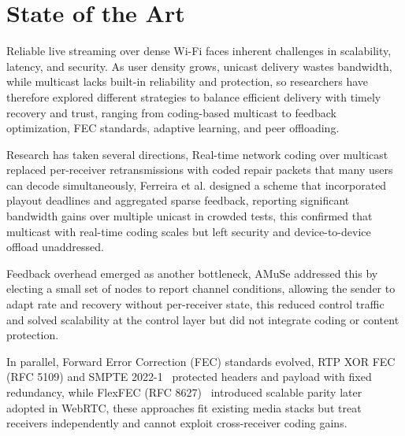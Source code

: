 
\chapter{State of the Art}


\label{State of the Art}

\quad Reliable live streaming over dense Wi-Fi faces inherent challenges in scalability, latency, and security. As user density grows, unicast delivery wastes bandwidth, while multicast lacks built-in reliability and protection, so researchers have therefore explored different strategies to balance efficient delivery with timely recovery and trust, ranging from coding-based multicast to feedback optimization, FEC standards, adaptive learning, and peer offloading.

\quad Research has taken several directions, Real-time network coding over multicast replaced per-receiver retransmissions with coded repair packets that many users can decode simultaneously, Ferreira et al.\cite{ferreira2019realtime} designed a scheme that incorporated playout deadlines and aggregated sparse feedback, reporting significant bandwidth gains over multiple unicast in crowded tests, this confirmed that multicast with real-time coding scales but left security and device-to-device offload unaddressed.

\quad Feedback overhead emerged as another bottleneck, AMuSe\cite{amaldi2010amuse} addressed this by electing a small set of nodes to report channel conditions, allowing the sender to adapt rate and recovery without per-receiver state, this reduced control traffic and solved scalability at the control layer but did not integrate coding or content protection.

\quad In parallel, Forward Error Correction (FEC) standards evolved, RTP XOR FEC (RFC 5109) and SMPTE 2022-1~\cite{perkins2003rfc5109,smpte2022} protected headers and payload with fixed redundancy, while FlexFEC (RFC 8627)~\cite{perkins2019flexfec} introduced scalable parity later adopted in WebRTC, these approaches fit existing media stacks but treat receivers independently and cannot exploit cross-receiver coding gains.

